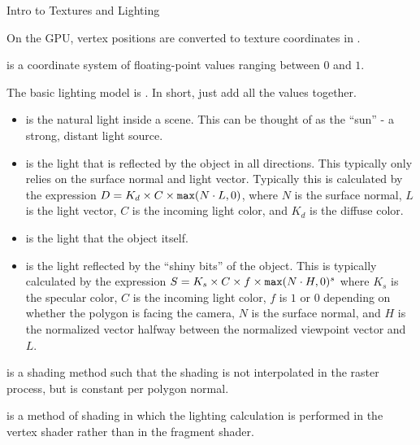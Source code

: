 \documentclass[11pt]{article}
\begin{document}
\maketitle

\begin{topic}{Intro to Textures and Lighting}
	\item On the GPU, vertex positions are converted to texture coordinates in .
	\item {} is a coordinate system of floating-point values ranging between $0$ and $1$.
	\item The basic lighting model is . In short, just add all the values together.
	\begin{itemize}
		\item {} is the natural light inside a scene. This can be thought of as the ``sun'' - a strong, distant light source.
		\item {} is the light that is reflected by the object in all directions. This typically only relies on the surface normal and light vector. Typically this is calculated by the expression $D = K_d \times C \times \texttt{max}(N \cdot L, 0)$, where $N$ is the surface normal, $L$ is the light vector, $C$ is the incoming light color, and $K_d$ is the diffuse color.
		\item {} is the light that the object itself.
		\item {} is the light reflected by the ``shiny bits'' of the object. This is typically calculated by the expression $S = K_s \times C \times f \times \texttt{max}(N \cdot H, 0)^{s}$ where $K_s$ is the specular color, $C$ is the incoming light color, $f$ is $1$ or $0$ depending on whether the polygon is facing the camera, $N$ is the surface normal, and $H$ is the normalized vector halfway between the normalized viewpoint vector and $L$.
	\end{itemize}
	\item {} is a shading method such that the shading is not interpolated in the raster process, but is constant per polygon normal.
	\item {} is a method of shading in which the lighting calculation is performed in the vertex shader rather than in the fragment shader.
\end{topic}
\end{document}
